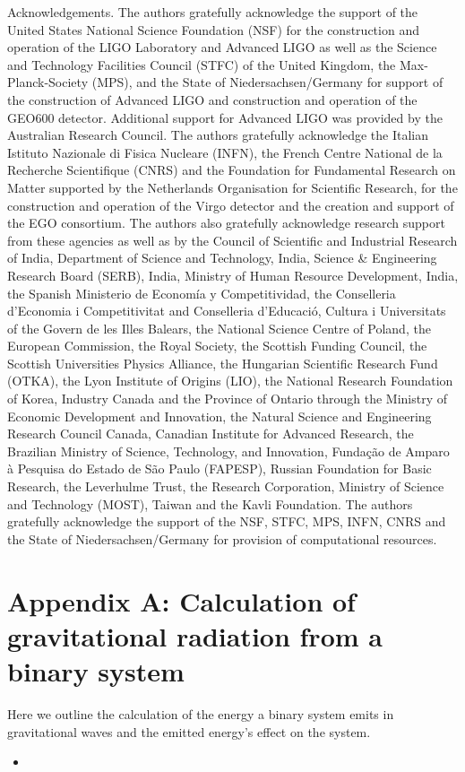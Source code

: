 \documentclass[10pt]{article}
\begin{document}
Acknowledgements. The authors gratefully acknowledge the support of the United States National Science Foundation (NSF) for the construction and operation of the LIGO Laboratory and Advanced LIGO as well as the Science and Technology Facilities Council (STFC) of the United Kingdom, the Max-Planck-Society (MPS), and the State of Niedersachsen/Germany for support of the construction of Advanced LIGO and construction and operation of the GEO600 detector. Additional support for Advanced LIGO was provided by the Australian Research Council. The authors gratefully acknowledge the Italian Istituto Nazionale di Fisica Nucleare (INFN), the French Centre National de la Recherche Scientifique (CNRS) and the Foundation for Fundamental Research on Matter supported by the Netherlands Organisation for Scientific Research, for the construction and operation of the Virgo detector and the creation and support of the EGO consortium. The authors also gratefully acknowledge research support from these agencies as well as by the Council of Scientific and Industrial Research of India, Department of Science and Technology, India, Science \& Engineering Research Board (SERB), India, Ministry of Human Resource Development, India, the Spanish Ministerio de Economía y Competitividad, the Conselleria d'Economia i Competitivitat and Conselleria d'Educació, Cultura i Universitats of the Govern de les Illes Balears, the National Science Centre of Poland, the European Commission, the Royal Society, the Scottish Funding Council, the Scottish Universities Physics Alliance, the Hungarian Scientific Research Fund (OTKA), the Lyon Institute of Origins (LIO), the National Research Foundation of Korea, Industry Canada and the Province of Ontario through the Ministry of Economic Development and Innovation, the Natural Science and Engineering Research Council Canada, Canadian Institute for Advanced Research, the Brazilian Ministry of Science, Technology, and Innovation, Fundação de Amparo à Pesquisa do Estado de São Paulo (FAPESP), Russian Foundation for Basic Research, the Leverhulme Trust, the Research Corporation, Ministry of Science and Technology (MOST), Taiwan and the Kavli Foundation. The authors gratefully acknowledge the support of the NSF, STFC, MPS, INFN, CNRS and the State of Niedersachsen/Germany for provision of computational resources.

\section*{Appendix A: Calculation of gravitational radiation from a binary system}
Here we outline the calculation of the energy a binary system emits in gravitational waves and the emitted energy's effect on the system.

\begin{itemize}
  \item 
\end{itemize}
\end{document}
